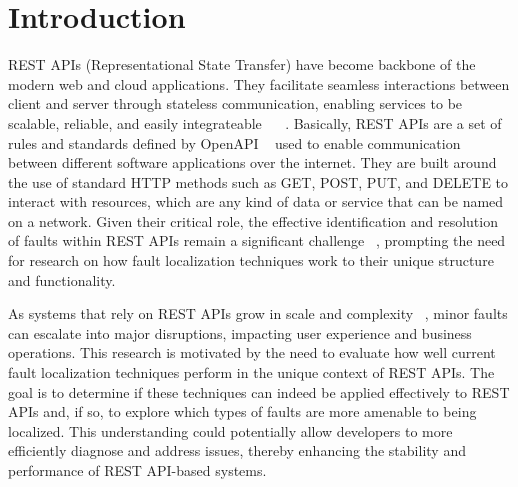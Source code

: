 \documentclass[conference]{IEEEtran}
\newcommand{\todo}[1]{\textcolor{red}{{\bfseries [[#1]]}}}
\begin{document}




\section{Introduction}
\label{sec:introduction}

    REST APIs (Representational State Transfer) have become backbone of the modern web and cloud applications. They facilitate seamless interactions between client and server through stateless communication, enabling services to be scalable, reliable, and easily integrateable ~\cite{li2016} ~\cite{neumann2018}. Basically, REST APIs are a set of rules and standards  defined by OpenAPI ~\cite{ed-douibi2018} used to enable communication between different software applications over the internet. They are built around the use of standard HTTP methods such as GET, POST, PUT, and DELETE to interact with resources, which are any kind of data or service that can be named on a network.
    Given their critical role, the effective identification and resolution of faults within REST APIs remain a significant challenge ~\cite{barbir2007}, prompting the need for research on how fault localization techniques work to their unique structure and functionality.



    As systems that rely on REST APIs grow in scale and complexity ~\cite{khare2004}, minor faults can escalate into major disruptions, impacting user experience and business operations. 
    This research is motivated by the need to evaluate how well current fault localization techniques perform in the unique context of REST APIs. 
    The goal is to determine if these techniques can indeed be applied effectively to REST APIs and, if so, to explore which types of faults are more amenable to being localized. 
    This understanding could potentially allow developers to more efficiently diagnose and address issues, thereby enhancing the stability and performance of REST API-based systems.
\end{document}
